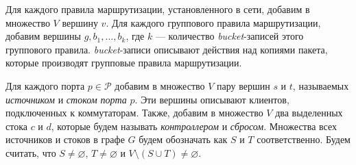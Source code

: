 \documentclass[../thesis.tex]{subfiles}
\begin{document}
Для каждого правила маршрутизации, установленного в сети, добавим в множество $V$ вершину $v$.
Для каждого группового правила маршрутизации, добавим вершины $g,b_1,\dots,b_k$, где $k$ --- количество \textit{bucket}-записей \cite{openflow15} этого группового правила.
\textit{bucket}-записи описывают действия над копиями пакета, которые производят групповые правила маршрутизации.

Для каждого порта $p\in\mathcal{P}$ добавим в множество $V$ пару вершин $s$ и $t$, называемых \textit{источником} и \textit{стоком порта} $p$.
Эти вершины описывают клиентов, подключенных к коммутаторам.
Также, добавим в множество $V$ два выделенных стока $c$ и $d$, которые будем называть \textit{контроллером} и \textit{сбросом}.
Множества всех источников и стоков в графе $G$ будем обозначать как $S$ и $T$ соответственно.
Будем считать, что $S\neq \varnothing$, $T\neq \varnothing$ и $V\setminus (S\cup T)\neq \varnothing$.
\end{document}
